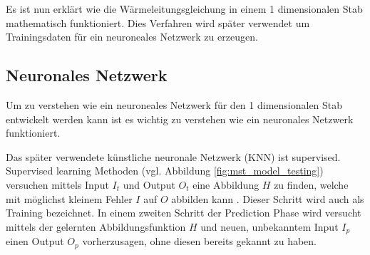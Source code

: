 Es ist nun erklärt wie die Wärmeleitungsgleichung in einem 1 dimensionalen Stab mathematisch funktioniert. Dies Verfahren wird später verwendet um Trainingsdaten für ein neuroneales Netzwerk zu erzeugen.


\subsection{Neuronales Netzwerk}

Um zu verstehen wie ein neuroneales Netzwerk für den 1 dimensionalen Stab entwickelt werden kann ist es wichtig zu verstehen wie ein neuronales Netzwerk funktioniert.

Das später verwendete künstliche neuronale Netzwerk (KNN) ist supervised. Supervised learning Methoden (vgl. Abbildung \ref{fig:mst_model_testing}) versuchen mittels Input $I_{t}$ und Output $O_{t}$ eine Abbildung $H$ zu finden, welche mit möglichst kleinem Fehler $I$ auf $O$ abbilden kann \cite{MIT:2015}. Dieser Schritt wird auch als Training bezeichnet. In einem zweiten Schritt der Prediction Phase wird versucht mittels der gelernten Abbildungsfunktion $H$ und neuen, unbekanntem Input $I_{p}$ einen Output $O_{p}$ vorherzusagen, ohne diesen bereits gekannt zu haben.


